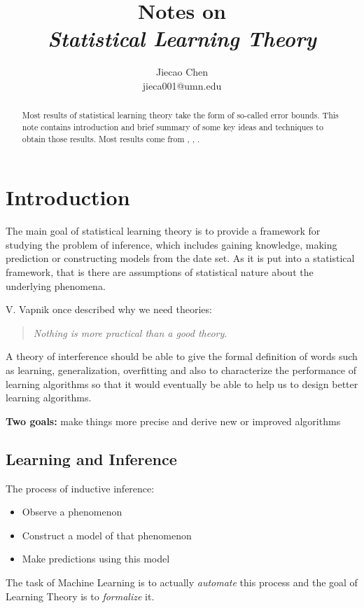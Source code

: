 \documentclass[12pt,reqno]{amsart}
\begin{document}
\title[Short version of title]{Notes on \\ \small \emph{Statistical Learning Theory}}
\author{Jiecao Chen \\ \tiny jieca001@umn.edu }

\maketitle

\begin{abstract}
Most results of statistical learning theory take the form
of so-called error bounds. This note contains introduction and
brief summary of some key ideas and techniques to obtain those
results. Most results come from \cite{paper1}, \cite{Book2}, \cite{paper3}.
\end{abstract}

\section{Introduction}
The main goal of statistical learning theory is to 
provide a framework for studying the problem of inference,
which includes gaining knowledge, making prediction or 
constructing models from the date set. As it is put into 
a statistical framework, that is there are assumptions
of statistical nature about the underlying phenomena.

V. Vapnik once described why we need theories:
\begin{quote}
	\textit{Nothing is more practical than a good theory}.
\end{quote}

A theory of interference should be able to give the 
formal definition of words such as learning, generalization,
overfitting and also to characterize the performance of 
learning algorithms so that it would eventually be able to
help us to design better learning algorithms.

\textbf{Two goals:} make things more precise and derive new or improved
algorithms

\subsection{Learning and Inference}
The process of inductive inference:
\begin{itemize}
\item Observe a phenomenon
\item Construct a model of that phenomenon
\item Make predictions using this model
\end{itemize}
The task of Machine Learning is to actually \textit{automate} this 
process and the goal of Learning Theory is to \textit{formalize} it.
\end{document}
